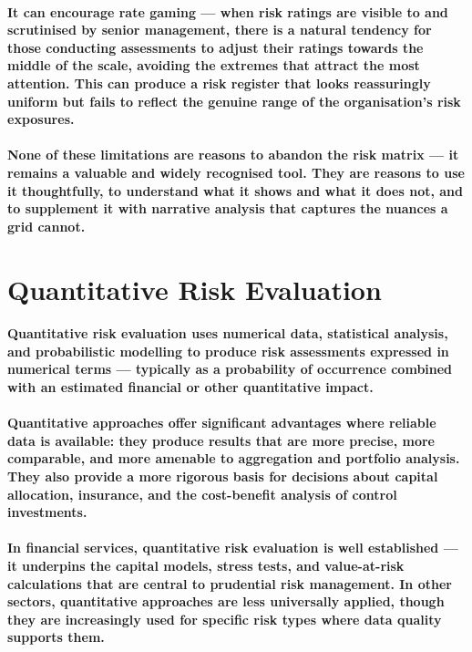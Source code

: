 \paragraph{\textbf{It can encourage rate gaming} — when risk ratings are visible to and scrutinised by senior management, there is a natural tendency for those conducting assessments to adjust their ratings towards the middle of the scale, avoiding the extremes that attract the most attention. This can produce a risk register that looks reassuringly uniform but fails to reflect the genuine range of the organisation's risk exposures.}
\paragraph{None of these limitations are reasons to abandon the risk matrix — it remains a valuable and widely recognised tool. They are reasons to use it thoughtfully, to understand what it shows and what it does not, and to supplement it with narrative analysis that captures the nuances a grid cannot.}

\section{Quantitative Risk Evaluation}
\paragraph{\textbf{Quantitative risk evaluation} uses numerical data, statistical analysis, and probabilistic modelling to produce risk assessments expressed in numerical terms — typically as a probability of occurrence combined with an estimated financial or other quantitative impact.}
\paragraph{Quantitative approaches offer significant advantages where reliable data is available: they produce results that are more precise, more comparable, and more amenable to aggregation and portfolio analysis. They also provide a more rigorous basis for decisions about capital allocation, insurance, and the cost-benefit analysis of control investments.}
\paragraph{In financial services, quantitative risk evaluation is well established — it underpins the capital models, stress tests, and value-at-risk calculations that are central to prudential risk management. In other sectors, quantitative approaches are less universally applied, though they are increasingly used for specific risk types where data quality supports them.}
